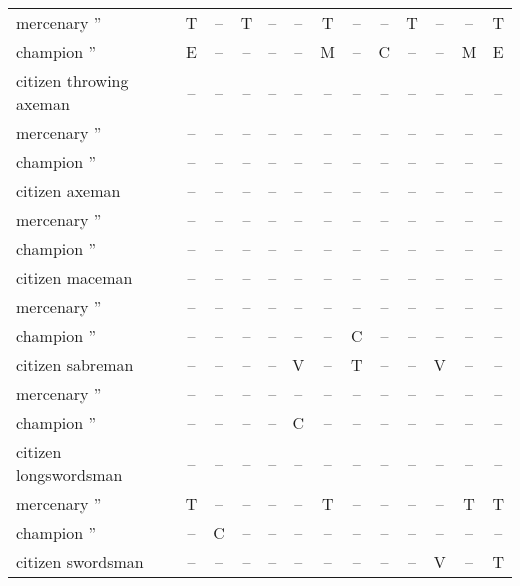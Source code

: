 \documentclass{article}
\begin{document}
\begin{tabular}{l|cccc|cccc|cccc}
mercenary ''                          & T  & -- & T  & -- & -- & T  & -- & -- & T  & -- & -- & T  \\
champion  ''                          & E  & -- & -- & -- & -- & M  & -- & C  & -- & -- & M  & E  \\
\hline
citizen throwing axeman               & -- & -- & -- & -- & -- & -- & -- & -- & -- & -- & -- & -- \\
mercenary ''                          & -- & -- & -- & -- & -- & -- & -- & -- & -- & -- & -- & -- \\
champion  ''                          & -- & -- & -- & -- & -- & -- & -- & -- & -- & -- & -- & -- \\
\hline
citizen axeman                        & -- & -- & -- & -- & -- & -- & -- & -- & -- & -- & -- & -- \\
mercenary ''                          & -- & -- & -- & -- & -- & -- & -- & -- & -- & -- & -- & -- \\
champion  ''                          & -- & -- & -- & -- & -- & -- & -- & -- & -- & -- & -- & -- \\
\hline
citizen maceman                       & -- & -- & -- & -- & -- & -- & -- & -- & -- & -- & -- & -- \\
mercenary ''                          & -- & -- & -- & -- & -- & -- & -- & -- & -- & -- & -- & -- \\
champion  ''                          & -- & -- & -- & -- & -- & -- & C  & -- & -- & -- & -- & -- \\
\hline
citizen sabreman                      & -- & -- & -- & -- & V  & -- & T  & -- & -- & V  & -- & -- \\
mercenary ''                          & -- & -- & -- & -- & -- & -- & -- & -- & -- & -- & -- & -- \\
champion  ''                          & -- & -- & -- & -- & C  & -- & -- & -- & -- & -- & -- & -- \\
\hline
citizen longswordsman                 & -- & -- & -- & -- & -- & -- & -- & -- & -- & -- & -- & -- \\
mercenary ''                          & T  & -- & -- & -- & -- & T  & -- & -- & -- & -- & T  & T  \\
champion  ''                          & -- & C  & -- & -- & -- & -- & -- & -- & -- & -- & -- & -- \\
\hline
citizen swordsman                     & -- & -- & -- & -- & -- & -- & -- & -- & -- & V  & -- & T  \\

\end{tabular}
\end{document}

